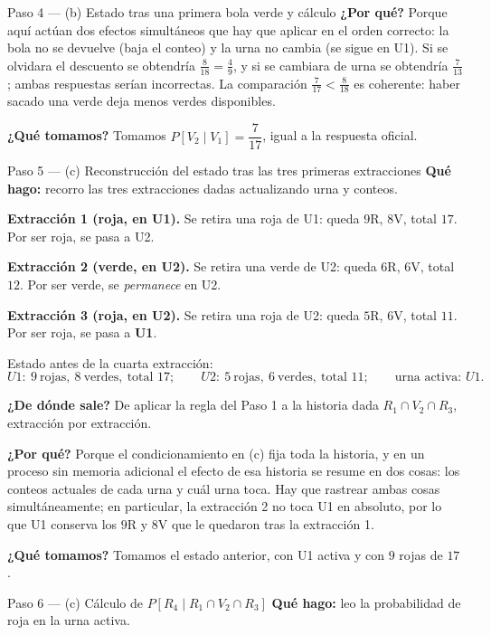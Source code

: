 \documentclass[11pt]{article}
\begin{document}
\begin{sol}
\begin{paso}{Paso 4 --- (b) Estado tras una primera bola verde y c\'alculo}
\textbf{¿Por qu\'e?} Porque aqu\'i act\'uan dos efectos simult\'aneos que hay que aplicar en el orden correcto: la bola no se devuelve (baja el conteo) y la urna no cambia (se sigue en U1). Si se olvidara el descuento se obtendr\'ia $\frac{8}{18}=\frac{4}{9}$, y si se cambiara de urna se obtendr\'ia $\frac{7}{13}$; ambas respuestas ser\'ian incorrectas. La comparaci\'on $\frac{7}{17}<\frac{8}{18}$ es coherente: haber sacado una verde deja menos verdes disponibles.

\textbf{¿Qu\'e tomamos?} Tomamos $P[V_2\mid V_1]=\dfrac{7}{17}$, igual a la respuesta oficial.
\end{paso}

\begin{paso}{Paso 5 --- (c) Reconstrucci\'on del estado tras las tres primeras extracciones}
\textbf{Qu\'e hago:} recorro las tres extracciones dadas actualizando urna y conteos.

\textbf{Extracci\'on 1 (roja, en U1).} Se retira una roja de U1: queda $9$R, $8$V, total $17$. Por ser roja, se pasa a U2.

\textbf{Extracci\'on 2 (verde, en U2).} Se retira una verde de U2: queda $6$R, $6$V, total $12$. Por ser verde, se \emph{permanece} en U2.

\textbf{Extracci\'on 3 (roja, en U2).} Se retira una roja de U2: queda $5$R, $6$V, total $11$. Por ser roja, se pasa a \textbf{U1}.

Estado antes de la cuarta extracci\'on:
\[
U1:\ 9\ \text{rojas},\ 8\ \text{verdes},\ \text{total } 17;
\qquad
U2:\ 5\ \text{rojas},\ 6\ \text{verdes},\ \text{total } 11;
\qquad
\text{urna activa: } U1 .
\]

\textbf{¿De d\'onde sale?} De aplicar la regla del Paso 1 a la historia dada $R_1\cap V_2\cap R_3$, extracci\'on por extracci\'on.

\textbf{¿Por qu\'e?} Porque el condicionamiento en (c) fija toda la historia, y en un proceso sin memoria adicional el efecto de esa historia se resume en dos cosas: los conteos actuales de cada urna y cu\'al urna toca. Hay que rastrear ambas cosas simult\'aneamente; en particular, la extracci\'on 2 no toca U1 en absoluto, por lo que U1 conserva los $9$R y $8$V que le quedaron tras la extracci\'on 1.

\textbf{¿Qu\'e tomamos?} Tomamos el estado anterior, con U1 activa y con $9$ rojas de $17$.
\end{paso}

\begin{paso}{Paso 6 --- (c) C\'alculo de $P[R_4\mid R_1\cap V_2\cap R_3]$}
\textbf{Qu\'e hago:} leo la probabilidad de roja en la urna activa.


\end{paso}
\end{sol}
\end{document}
